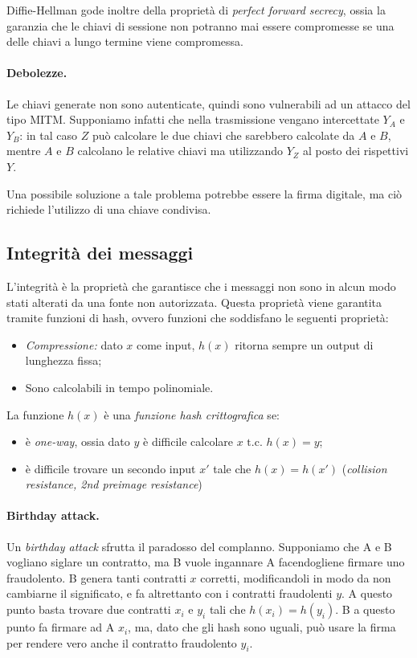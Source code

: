 \documentclass[a4paper, 11pt, twoside]{article}
\begin{document}
	Diffie-Hellman gode inoltre della proprietà di \textit{perfect forward secrecy}, ossia la garanzia che le chiavi di sessione non potranno mai essere compromesse se una delle chiavi a lungo termine viene compromessa.
	
	\paragraph{Debolezze.} Le chiavi generate non sono autenticate, quindi sono vulnerabili ad un attacco del tipo MITM.
	Supponiamo infatti che nella trasmissione vengano intercettate $Y_A$ e $Y_B$: in tal caso $Z$ può calcolare le due chiavi che sarebbero calcolate da $A$ e $B$, mentre $A$ e $B$ calcolano le relative chiavi ma utilizzando $Y_Z$ al posto dei rispettivi $Y$.
	
	Una possibile soluzione a tale problema potrebbe essere la firma digitale, ma ciò richiede l'utilizzo di una chiave condivisa.
	
	\subsection{Integrità dei messaggi}
	L'integrità è la proprietà che garantisce che i messaggi non sono in alcun modo stati alterati da una fonte non autorizzata. Questa proprietà viene garantita tramite funzioni di hash, ovvero funzioni che soddisfano le seguenti proprietà: \begin{itemize}
		\item \textit{Compressione:} dato $x$ come input, $h(x) $ ritorna sempre un output di lunghezza fissa;
		\item Sono calcolabili in tempo polinomiale.
	\end{itemize}
	
	La funzione $h(x)$ è una \textit{funzione hash crittografica} se:\begin{itemize}
		\item è \textit{one-way}, ossia dato $y$ è difficile calcolare $x \text{ t.c. } h(x) = y$;
		\item è difficile trovare un secondo input $x'$ tale che $h(x) = h(x')$ (\textit{collision resistance, 2nd preimage resistance})
	\end{itemize}
	
	\paragraph{Birthday attack.} Un \textit{birthday attack} sfrutta il paradosso del complanno. Supponiamo che A e B vogliano siglare un contratto, ma B vuole ingannare A facendogliene firmare uno fraudolento. B genera tanti contratti $x$ corretti, modificandoli in modo da non cambiarne il significato, e fa altrettanto con i contratti fraudolenti $y$. A questo punto basta trovare due contratti $x_i$ e $y_i$ tali che $h(x_i) = h(y_i)$. B a questo punto fa firmare ad A $x_i$, ma, dato che gli hash sono uguali, può usare la firma per rendere vero anche il contratto fraudolento $y_i$.
	
\end{document}
